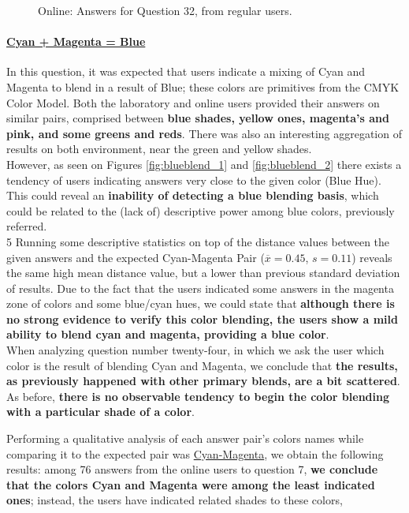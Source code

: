 \begin{figure}[!htbp]
\begin{minipage}{0.48\textwidth}
    \caption[Online: Answers for Question 32, from regular users.]{Online: Answers for Question 32, from regular users.}
    \label{fig:greenblend_2}
  \end{minipage}
\end{figure}
%
\paragraph{\ul{Cyan + Magenta = Blue}}
%
In this question, it was expected that users indicate a mixing of Cyan and Magenta to blend in a result of Blue; these colors are primitives from the CMYK Color Model. Both the laboratory and online users provided their answers
on similar pairs, comprised between \textbf{blue shades, yellow ones, magenta's and pink, and some greens and reds}. There was also an interesting aggregation of results on both environment, near the green and yellow shades.  \\
%
However, as seen on Figures \ref{fig:blueblend_1} and \ref{fig:blueblend_2} there exists a tendency of users indicating answers very close to the given color (Blue Hue). This could reveal an \textbf{inability of detecting a blue blending
basis}, which could be related to the (lack of) descriptive power among blue colors, previously referred. \\
5
Running some descriptive statistics on top of the distance values between the given answers and the expected Cyan-Magenta Pair ($\overline{x} = 0.45$, $s = 0.11$) reveals the same high mean distance value, but a lower than previous
standard deviation of results. Due to the fact that the users indicated some answers in the magenta zone of colors and some blue/cyan hues, we could state that \textbf{although there is no strong evidence to verify this color blending, the
users show a mild ability to blend cyan and magenta, providing a blue color}. \\
%
When analyzing question number twenty-four, in which we ask the user which color is the result of blending Cyan and Magenta, we conclude that \textbf{the results, as previously happened with other primary blends, are a bit scattered}.
As before, \textbf{there is no observable tendency to begin the color blending with a particular shade of a color}. \par
%
Performing a qualitative analysis of each answer pair's colors names while comparing it to the expected pair was
\ul{Cyan-Magenta}, we obtain the following results: among 76 answers from the online users to question 7, \textbf{we conclude
that the colors Cyan and Magenta were among the least indicated ones}; instead, the users have indicated related shades to these colors,
